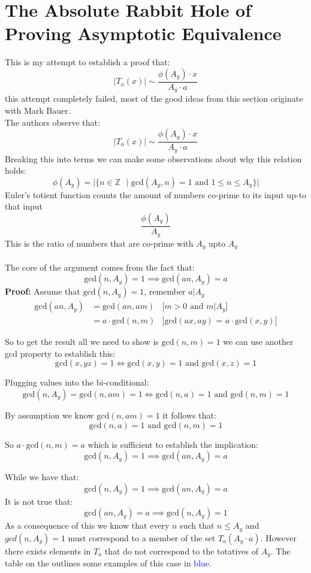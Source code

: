 \documentclass[12pt]{amsart}
\theoremstyle{definition}
\numberwithin{equation}{section}
\begin{document}
\section{The Absolute Rabbit Hole of Proving Asymptotic Equivalence }
This is my attempt to establish a proof that:  $$|T_a(x)|  \sim  \frac{\phi(A_y) \cdot x}{ A_y \cdot a}$$ this attempt completely failed, most of the good ideas from this section originate with Mark Bauer.\\

The authors observe that:
    $$|T_a(x)|  \sim  \frac{\phi(A_y) \cdot x}{ A_y \cdot a}$$
    Breaking this into terms we can make some observations about why this relation holds:
    $$\phi(A_y) = |\{n \in \mathbb{Z} \text{ } | \text{ gcd}(A_y,n) = 1 \text{ and } 1 \leq n \leq A_y \}|$$
    Euler's totient function counts the amount of numbers co-prime to its input up-to that input
    $$ \frac{\phi(A_y)}{ A_y }$$
    This is the ratio of numbers that are co-prime with $A_y$ upto $A_y$\\\\
    The core of the argument comes from the fact that: $$\text{gcd}(n, A_y) = 1 \implies \text{gcd}(an, A_y) = a  $$
\textbf{Proof:}\linebreak  
Assume that $\text{gcd}(n, A_y) = 1$, remember $a|A_y$ \begin{align*}
    \text{gcd}(an, A_y) &=  \text{gcd}(an, am) & \text{[$m>0$ and $m|A_y$]}\\
    &= a \cdot  \text{gcd}(n, m) & \text{[gcd$(ax,ay)$ = $a \cdot \text{gcd}(x,y)$]}
\end{align*}

So to get the result all we need to show is $\text{gcd}(n, m) = 1$ we can use another gcd property to establish this: $$\text{gcd}(x, yz) = 1 \iff \text{gcd}(x, y) = 1 \text{ and } \text{gcd}(x, z) = 1$$

Plugging values into the bi-conditional:
$$\text{gcd}(n, A_y) = \text{gcd}(n, am) = 1 \iff \text{gcd}(n, a) = 1 \text{ and } \text{gcd}(n, m) = 1$$

By assumption we know $\text{gcd}(n, am) = 1$ it follows that: $$\text{gcd}(n, a) = 1 \text{ and } \text{gcd}(n, m) = 1$$ 

So $a \cdot  \text{gcd}(n, m) = a$ which is sufficient to establish the implication:
$$\text{gcd}(n, A_y) = 1 \implies \text{gcd}(an, A_y) = a$$

While we have that: $$\text{gcd}(n, A_y) = 1 \implies \text{gcd}(an, A_y) = a$$
    It is not true that: $$ \text{gcd}(an, A_y) = a  \implies \text{gcd}(n, A_y) = 1$$
    As a consequence of this we know that every $n$ such that $n \leq A_y$ and $gcd(n, A_y) = 1$ must correspond to a member of the set $T_a(A_y \cdot a)$. \linebreak \linebreak  However there exists elements in $T_a$ that do not correspond to the totatives of $A_y$. The table on the  outlines some examples of this case in \textcolor{blue}{blue}.
    
\end{document}
